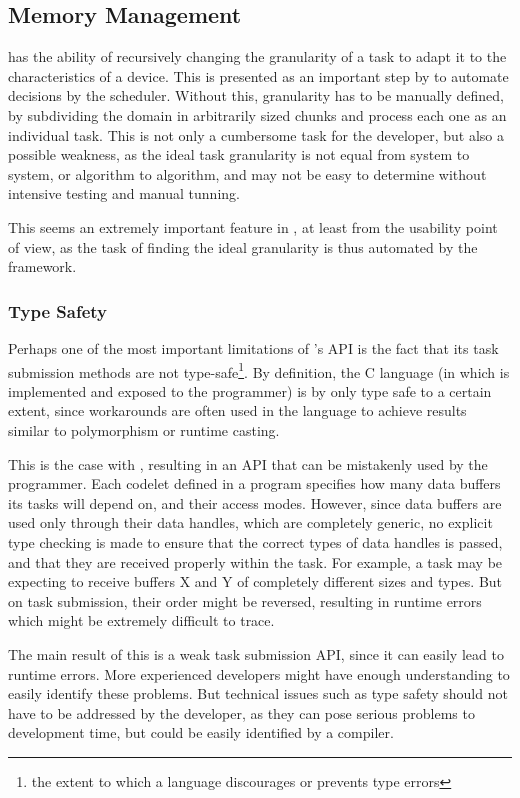 \documentclass[main.tex]{subfiles}
\begin{document}
\subsection{Memory Management}

\gama has the ability of recursively changing the granularity of a task to adapt it to the characteristics of a device. This is presented as an important step by \gama to automate decisions by the scheduler. Without this, granularity has to be manually defined, by subdividing the domain in arbitrarily sized chunks and process each one as an individual task. This is not only a cumbersome task for the developer, but also a possible weakness, as the ideal task granularity is not equal from system to system, or algorithm to algorithm, and may not be easy to determine without intensive testing and manual tunning.

This seems an extremely important feature in \gama, at least from the usability point of view, as the task of finding the ideal granularity is thus automated by the framework.

\subsubsection{Type Safety} \label{sec:comparison:type_safety}

Perhaps one of the most important limitations of \starpu's API is the fact that its task submission methods are not type-safe\footnote{the extent to which a language discourages or prevents type errors}. By definition, the C language (in which \starpu is implemented and exposed to the programmer) is by only type safe to a certain extent, since workarounds are often used in the language to achieve results similar to polymorphism or runtime casting.

This is the case with \starpu, resulting in an API that can be mistakenly used by the programmer. Each codelet defined in a program specifies how many data buffers its tasks will depend on, and their access modes. However, since data buffers are used only through their data handles, which are completely generic, no explicit type checking is made to ensure that the correct types of data handles is passed, and that they are received properly within the task. For example, a task may be expecting to receive buffers X and Y of completely different sizes and types. But on task submission, their order might be reversed, resulting in runtime errors which might be extremely difficult to trace.

The main result of this is a weak task submission API, since it can easily lead to runtime errors. More experienced developers might have enough understanding to easily identify these problems. But technical issues such as type safety should not have to be addressed by the developer, as they can pose serious problems to development time, but could be easily identified by a compiler.
\end{document}
